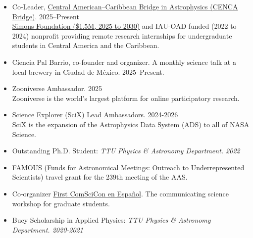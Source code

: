 \documentclass[letterpaper,10pt]{article}
\begin{document}
\begin{itemize}[label=$\blacktriangleright$]


\item Co-Leader, \href{https://cencabridgeastro.weebly.com/}{Central American--Caribbean Bridge in Astrophysics (CENCA Bridge)}. 2025--Present\\
{\small \href{https://astro4dev.org/iau-oad-project-wins-1-5-million-grant-from-simons-foundation/}{Simons Foundation (\$1.5M, 2025 to 2030)} and IAU-OAD funded (2022 to 2024) nonprofit providing remote research internships for undergraduate students in Central America and the Caribbean.} %

\item Ciencia Pal Barrio, co-founder and organizer. A monthly science talk at a local brewery in Ciudad de M\'exico. 2025--Present.


\item Zooniverse Ambassador. 2025 \\
Zooniverse is the world's largest platform for online participatory research. 


\item \href{https://scixplorer.org/scixblog/announcing-2024-ambassadors}{Science Explorer (SciX)  Lead Ambassadors. 2024-2026} \\
SciX is the expansion of the Astrophysics Data System (ADS) to all of NASA Science. 


\item Outstanding Ph.D. Student: \emph{TTU Physics \& Astronomy Department. 2022} %

\item FAMOUS (Funds for Astronomical Meetings: Outreach to Underrepresented Scientists) travel grant for the 239th meeting of the AAS.

\item Co-organizer \href{https://comscicon.com/comscicon-en-espanol-2021}{First ComSciCon en Espa\~nol}. The communicating science workshop for graduate students.




\item Bucy Scholarship in Applied Physics: \emph{TTU Physics \& Astronomy Department. 2020-2021} %





\end{itemize}
\end{document}
